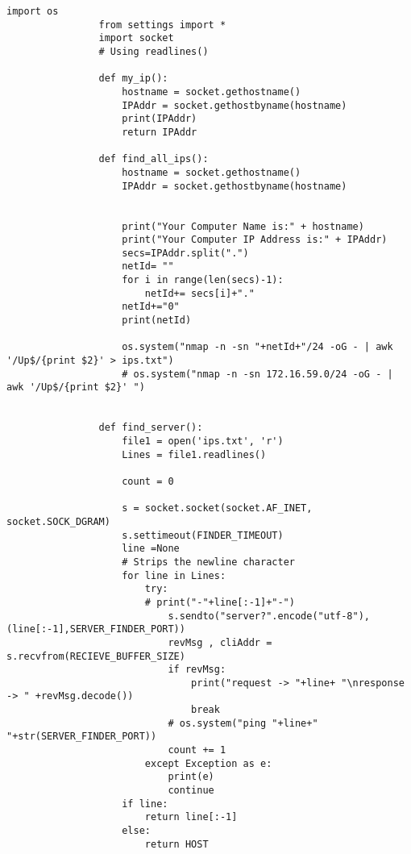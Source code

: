             \begin{lstlisting}[style=pythonstyle, caption=server finder]
                import os
                from settings import *
                import socket
                # Using readlines()
                
                def my_ip():
                    hostname = socket.gethostname()
                    IPAddr = socket.gethostbyname(hostname)
                    print(IPAddr)
                    return IPAddr
                
                def find_all_ips():
                    hostname = socket.gethostname()
                    IPAddr = socket.gethostbyname(hostname)
                
                    
                    print("Your Computer Name is:" + hostname)
                    print("Your Computer IP Address is:" + IPAddr)
                    secs=IPAddr.split(".")
                    netId= ""
                    for i in range(len(secs)-1):
                        netId+= secs[i]+"."
                    netId+="0"
                    print(netId)
                    
                    os.system("nmap -n -sn "+netId+"/24 -oG - | awk '/Up$/{print $2}' > ips.txt")
                    # os.system("nmap -n -sn 172.16.59.0/24 -oG - | awk '/Up$/{print $2}' ")
                
                
                def find_server():
                    file1 = open('ips.txt', 'r')
                    Lines = file1.readlines()
                    
                    count = 0
                
                    s = socket.socket(socket.AF_INET, socket.SOCK_DGRAM)
                    s.settimeout(FINDER_TIMEOUT)
                    line =None
                    # Strips the newline character
                    for line in Lines:
                        try:
                        # print("-"+line[:-1]+"-")
                            s.sendto("server?".encode("utf-8"), (line[:-1],SERVER_FINDER_PORT))
                            revMsg , cliAddr = s.recvfrom(RECIEVE_BUFFER_SIZE)
                            if revMsg:
                                print("request -> "+line+ "\nresponse -> " +revMsg.decode())
                                break
                            # os.system("ping "+line+" "+str(SERVER_FINDER_PORT))
                            count += 1
                        except Exception as e:
                            print(e)
                            continue
                    if line:
                        return line[:-1]
                    else:
                        return HOST
                
            \end{lstlisting}
